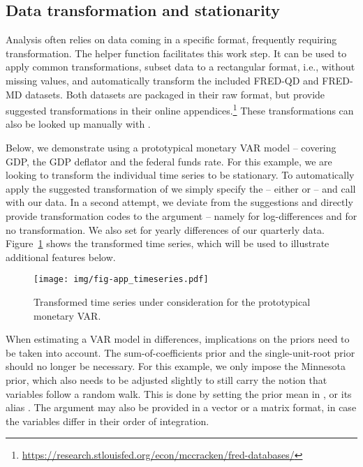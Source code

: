 \documentclass[article,nojss]{jss} %
\begin{document}
\begin{appendix}

\section{Data transformation and stationarity}\label{app:data}

Analysis often relies on data coming in a specific format, frequently requiring transformation. The helper function  facilitates this work step. It can be used to apply common transformations, subset data to a rectangular format, i.e., without missing values, and automatically transform the included FRED-QD and FRED-MD datasets.
Both datasets are packaged in their raw format, but \cite{mccracken2016} provide suggested transformations in their online appendices.\footnote{\url{https://research.stlouisfed.org/econ/mccracken/fred-databases/}} These transformations can also be looked up manually with .

Below, we demonstrate using a prototypical monetary VAR model -- covering GDP, the GDP deflator and the federal funds rate. For this example, we are looking to transform the individual time series to be stationary.
To automatically apply the suggested transformation of \cite{mccracken2016} we simply specify the  -- either  or  -- and call  with our data.
In a second attempt, we deviate from the suggestions and directly provide transformation codes to the  argument -- namely  for log-differences and  for no transformation. We also set  for yearly differences of our quarterly data. Figure~\ref{fig:app_timeseries} shows the transformed time series, which will be used to illustrate additional features below.



\begin{figure}[ht]
  \centering
  \texttt{[image: img/fig-app\_timeseries.pdf]}
  \caption{Transformed time series under consideration for the prototypical monetary VAR.}
  \label{fig:app_timeseries}
\end{figure}

When estimating a VAR model in differences, implications on the priors need to be taken into account. The sum-of-coefficients prior and the single-unit-root prior should no longer be necessary.
For this example, we only impose the Minnesota prior, which also needs to be adjusted slightly to still carry the notion that variables follow a random walk. This is done by setting the prior mean  in , or its alias . The argument may also be provided in a vector or a matrix format, in case the variables differ in their order of integration.


\end{appendix}
\end{document}
